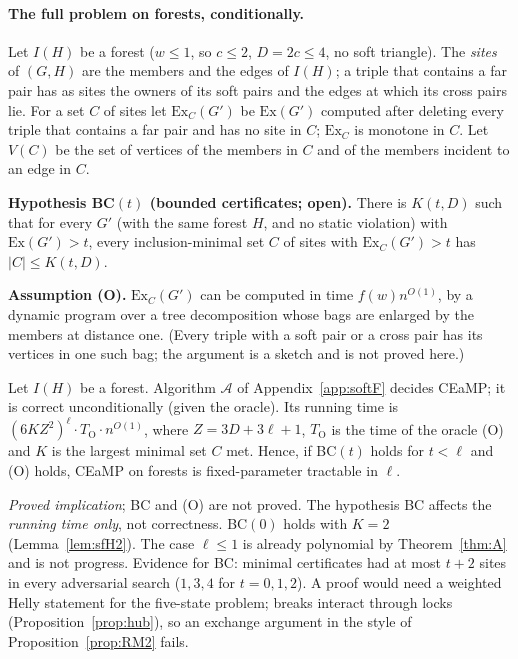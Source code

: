 \paragraph{The full problem on forests, conditionally.}
Let $I(H)$ be a forest ($w\le1$, so $c\le2$, $D=2c\le4$, no soft triangle). The \emph{sites} of $(G,H)$ are the members and the edges of $I(H)$; a triple that contains a far pair has as sites the owners of its soft pairs and the edges at which its cross pairs lie. For a set $C$ of sites let $\mathrm{Ex}_C(G')$ be $\mathrm{Ex}(G')$ computed after deleting every triple that contains a far pair and has no site in $C$; $\mathrm{Ex}_C$ is monotone in $C$. Let $V(C)$ be the set of vertices of the members in $C$ and of the members incident to an edge in $C$.

\textbf{Hypothesis BC$(t)$ (bounded certificates; open).} There is $K(t,D)$ such that for every $G'$ (with the same forest $H$, and no static violation) with $\mathrm{Ex}(G')>t$, every inclusion-minimal set $C$ of sites with $\mathrm{Ex}_C(G')>t$ has $|C|\le K(t,D)$.

\textbf{Assumption (O).} $\mathrm{Ex}_C(G')$ can be computed in time $f(w)n^{O(1)}$, by a dynamic program over a tree decomposition whose bags are enlarged by the members at distance one. (Every triple with a soft pair or a cross pair has its vertices in one such bag; the argument is a sketch and is not proved here.)
\begin{theorem}\label{thm:F}
Let $I(H)$ be a forest. Algorithm $\mathcal A$ of Appendix~\ref{app:softF} decides CEaMP; it is correct unconditionally (given the oracle). Its running time is $(6KZ^{2})^{\ell}\cdot T_{\mathrm{O}}\cdot n^{O(1)}$, where $Z=3D+3\ell+1$, $T_{\mathrm{O}}$ is the time of the oracle (O) and $K$ is the largest minimal set $C$ met. Hence, if BC$(t)$ holds for $t<\ell$ and (O) holds, CEaMP on forests is fixed-parameter tractable in $\ell$.
\end{theorem}
\emph{Proved implication}; BC and (O) are not proved. The hypothesis BC affects the \emph{running time only}, not correctness. BC$(0)$ holds with $K=2$ (Lemma~\ref{lem:sfH2}). The case $\ell\le1$ is already polynomial by Theorem~\ref{thm:A} and is not progress. Evidence for BC: minimal certificates had at most $t+2$ sites in every adversarial search ($1,3,4$ for $t=0,1,2$). A proof would need a weighted Helly statement for the five-state problem; breaks interact through locks (Proposition~\ref{prop:hub}), so an exchange argument in the style of Proposition~\ref{prop:RM2} fails.

